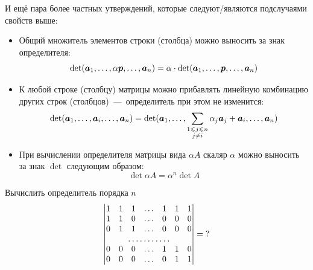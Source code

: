 \documentclass[a4paper,12pt]{article}
\begin{document}
  И ещё пара более частных утверждений, которые следуют/являются подслучаями свойств выше:
  \begin{itemize}
    \item Общий множитель элементов строки (столбца) можно выносить за знак определителя:
      \[
        \det (\boldsymbol a_1, \ldots, \alpha \boldsymbol p, \ldots, \boldsymbol a_n)
          = \alpha \cdot \det (\boldsymbol a_1, \ldots, \boldsymbol p, \ldots, \boldsymbol a_n)
      \]
    \item К любой строке (столбцу) матрицы можно прибавлять линейную комбинацию других строк (столбцов)~---~определитель при этом не изменится:
      \[
        \det (\boldsymbol a_1, \ldots, \boldsymbol a_i, \ldots, \boldsymbol a_n)
          = \det (\boldsymbol a_1, \ldots, \sum_{\substack{1 \leqslant j \leqslant n\\j \not= i}} \alpha_j \boldsymbol a_j + \boldsymbol a_i, \ldots, \boldsymbol a_n)
      \]
    \item При вычислении определителя матрицы вида $\alpha A$ скаляр $\alpha$ можно выносить за знак $\det$ следующим образом:
      \[
        \det \alpha A = \alpha^n \det A
      \]
  \end{itemize}
  
  \begin{problem}[14.24(1)]
    Вычислить определитель порядка $n$
    \[
      \begin{vmatrix}
        1 & 1 & 1 & \ldots & 1 & 1 & 1\\
        1 & 1 & 0 & \ldots & 0 & 0 & 0\\
        0 & 1 & 1 & \ldots & 0 & 0 & 0\\
        \hdotsfor{7}\\
        0 & 0 & 0 & \ldots & 1 & 1 & 0\\
        0 & 0 & 0 & \ldots & 0 & 1 & 1
      \end{vmatrix} = \?
    \]
  \end{problem}
  
\end{document}
